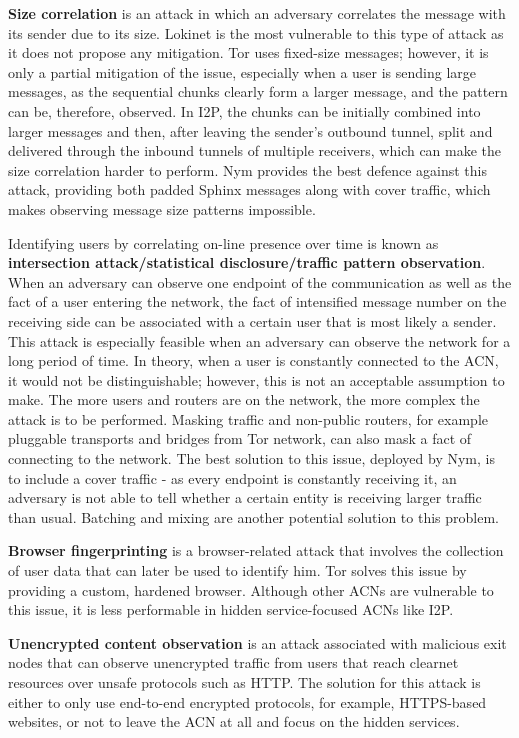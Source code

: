 \textbf{Size correlation} is an attack in which an adversary correlates the message with its sender due to its size. Lokinet is the most vulnerable to this type of attack as it does not propose any mitigation. Tor uses fixed-size messages; however, it is only a partial mitigation of the issue, especially when a user is sending large messages, as the sequential chunks clearly form a larger message, and the pattern can be, therefore, observed. In I2P, the chunks can be initially combined into larger messages and then, after leaving the sender’s outbound tunnel, split and delivered through the inbound tunnels of multiple receivers, which can make the size correlation harder to perform. Nym provides the best defence against this attack, providing both padded Sphinx messages along with cover traffic, which makes observing message size patterns impossible.

Identifying users by correlating on-line presence over time is known as \textbf{intersection attack/statistical disclosure/traffic pattern observation}. When an adversary can observe one endpoint of the communication as well as the fact of a user entering the network, the fact of intensified message number on the receiving side can be associated with a certain user that is most likely a sender. This attack is especially feasible when an adversary can observe the network for a long period of time. In theory, when a user is constantly connected to the ACN, it would not be distinguishable; however, this is not an acceptable assumption to make. The more users and routers are on the network, the more complex the attack is to be performed. Masking traffic and non-public routers, for example pluggable transports and bridges from Tor network, can also mask a fact of connecting to the network. The best solution to this issue, deployed by Nym, is to include a cover traffic - as every endpoint is constantly receiving it, an adversary is not able to tell whether a certain entity is receiving larger traffic than usual. Batching and mixing are another potential solution to this problem.

\textbf{Browser fingerprinting} is a browser-related attack that involves the collection of user data that can later be used to identify him. Tor solves this issue by providing a custom, hardened browser. Although other ACNs are vulnerable to this issue, it is less performable in hidden service-focused ACNs like I2P.

\textbf{Unencrypted content observation} is an attack associated with malicious exit nodes that can observe unencrypted traffic from users that reach clearnet resources over unsafe protocols such as HTTP. The solution for this attack is either to only use end-to-end encrypted protocols, for example, HTTPS-based websites, or not to leave the ACN at all and focus on the hidden services.

